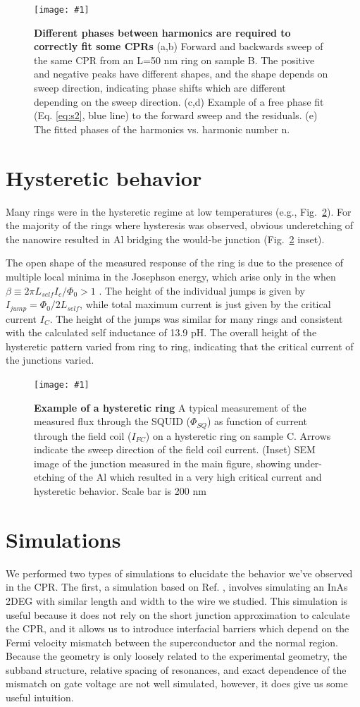 \documentclass[11pt]{article}
\newcommand{\fig}[5]{
	\begin{figure}
	\centerline{\texttt{[image: \#1]}}
\caption[#3]{\label{#2} \textbf{#3} #4}
\end{figure}}
\begin{document}
\fig{./free_phase_fit.pdf}{fig:free_phase_fit}
{Different phases between harmonics are required to correctly fit some CPRs}
{(a,b) Forward and backwards sweep of the same CPR from an L=50 nm ring on sample B. The positive and negative peaks have different shapes, and the shape depends on sweep direction, indicating phase shifts which are different depending on the sweep direction. (c,d) Example of a free phase fit (Eq. \ref{eq:s2}, blue line) to the forward sweep and the residuals. (e) The fitted phases of the harmonics vs. harmonic number n. }{0.9}


\section{Hysteretic behavior}

Many rings were in the hysteretic regime at low temperatures (e.g., Fig.~\ref{fig:hysteretic}). For the majority of the rings where hysteresis was observed, obvious underetching of the nanowire resulted in Al bridging the would-be junction (Fig.~\ref{fig:hysteretic} inset). 

The open shape of the measured response of the ring is due to the presence of multiple local minima in the Josephson energy, which arise only in the when $\beta \equiv 2\pi L_{self} I_c / \Phi_0 > 1$ . The height of the individual jumps is given by $I_{jump} = \Phi_0 / 2 L_{self} $, while total maximum current is just given by the critical current $I_C$. The height of the jumps was similar for many rings and consistent with the calculated self inductance of 13.9 pH. The overall height of the hysteretic pattern varied from ring to ring, indicating that the critical current of the junctions varied.

\fig{./hysteretic_ring.pdf}{fig:hysteretic}
{Example of a hysteretic ring}
{A typical measurement of the measured flux through the SQUID ($\Phi_{SQ}$) as function of current through the field coil ($I_{FC}$) on a hysteretic ring on sample C. Arrows indicate the sweep direction of the field coil current. (Inset) SEM image of the junction measured in the main figure, showing under-etching of the Al which resulted in a very high critical current and hysteretic behavior. Scale bar is 200 nm}{0.9}

\section{Simulations}

We performed two types of simulations to elucidate the behavior we've observed in the CPR. The first, a simulation based on Ref. , involves simulating an InAs 2DEG with similar length and width to the wire we studied. This simulation is useful because it does not rely on the short junction approximation to calculate the CPR, and it allows us to introduce interfacial barriers which depend on the Fermi velocity mismatch between the superconductor and the normal region. Because the geometry is only loosely related to the experimental geometry, the subband structure, relative spacing of resonances, and exact dependence of the mismatch on gate voltage are not well simulated, however, it does give us some useful intuition.
\end{document}
